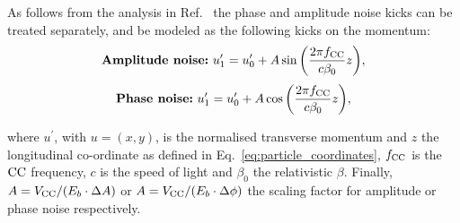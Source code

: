 As follows from the analysis in Ref.~\cite{PhysRevSTAB.18.101001} the phase and amplitude noise kicks can be treated separately, and be modeled as the following kicks on the momentum: %
\begin{equation}\label{eq:amplitude_noise_kick}
  \textbf{\textrm{Amplitude noise:}} \  u^\prime_1 =  u^\prime_0 + A \sin{\left (  \frac{2 \pi {f_\mathrm{CC}}}{c \beta_0}z   \right )},
\end{equation}
\begin{equation}\label{eq:phase_noise_kick}
    \textbf{\textrm{Phase noise:}} \ u^\prime_1 =  u^\prime_0 + A \cos{\left (  \frac{2 \pi {f_\mathrm{CC}}}{c \beta_0}z   \right )},
\end{equation}

where $u^\prime$, with $u=(x,y)$, is the normalised transverse momentum and $z$ the longitudinal co-ordinate as defined in Eq.~\eqref{eq:particle_coordinates}, ${f_\mathrm{CC}}$ is the ${\mathrm{CC}}$ frequency, $c$ is the speed of light and $\beta_0$ the relativistic $\beta$. Finally, $A={V_\mathrm{CC}} /(E_b \cdot \Delta A )$ or $A={V_\mathrm{CC}} /(E_b \cdot \Delta \phi )$ the scaling factor for amplitude or phase noise respectively.